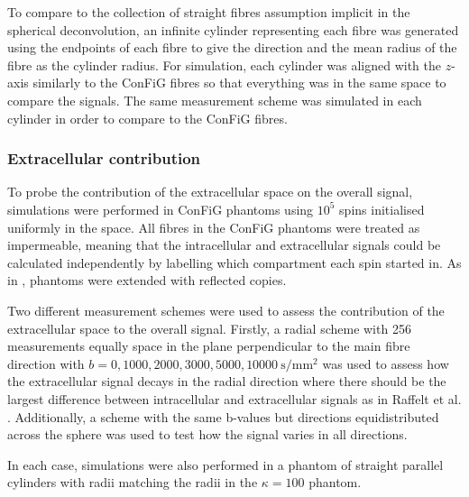 To compare to the collection of straight fibres assumption implicit in the spherical deconvolution, an infinite cylinder representing each fibre was generated using the endpoints of each fibre to give the direction and the mean radius of the fibre as the cylinder radius. For simulation, each cylinder was aligned with the $z$-axis similarly to the ConFiG fibres so that everything was in the same space to compare the signals. The same measurement scheme was simulated in each cylinder in order to compare to the \ac{ConFiG} fibres.


\subsubsection{Extracellular contribution}
\label{sec:frf_method_extra}
To probe the contribution of the extracellular space on the overall signal, simulations were performed in \ac{ConFiG} phantoms using $10^5$ spins initialised uniformly in the space.
All fibres in the \ac{ConFiG} phantoms were treated as impermeable, meaning that the intracellular and extracellular signals could be calculated independently by labelling which compartment each spin started in. As in , phantoms were extended with reflected copies.

Two different measurement schemes were used to assess the contribution of the extracellular space to the overall signal. Firstly, a radial scheme with 256 measurements equally space in the plane perpendicular to the main fibre direction with $b = 0, 1000, 2000, 3000, 5000, \SI{10000}{\second\per\milli\metre\squared}$ was used to assess how the extracellular signal decays in the radial direction where there should be the largest difference between intracellular and extracellular signals as in Raffelt et al. \cite{Raffelt2012}. Additionally, a scheme with the same b-values but directions equidistributed across the sphere was used to test how the signal varies in all directions.

In each case, simulations were also performed in a phantom of straight parallel cylinders with radii matching the radii in the $\kappa=100$ phantom.

